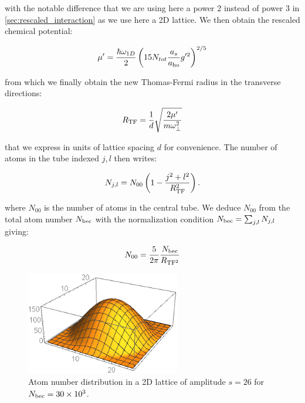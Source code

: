 \noindent with the notable difference that we are using here a power 2 instead of power 3 in \ref{sec:rescaled_interaction} as we use here a 2D lattice. We then obtain the rescaled chemical potential:

\begin{equation}
    \mu' = \frac{\hbar \omega_{1D}}{2} \left( 15 N_{tot} \frac{a_s}{a_{\rm{ho}}} g'^2 \right)^{2/5}
\end{equation}

\noindent from which we finally obtain the new Thomas-Fermi radius in the transverse directions:

\begin{equation}
    R_{\rm{TF}} = \frac{1}{d} \sqrt{\frac{2 \mu'}{m \omega_{\perp}^2}}
\end{equation}

\noindent that we express in units of lattice spacing $d$ for convenience. The number of atoms in the tube indexed $j,l$ then writes:

\begin{equation}\label{eq:N_per_tube}
    N_{j,l} = N_{00} \left( 1 - \frac{j^2 + l^2}{R_{\rm{TF}}^2} \right) .
\end{equation}

\noindent where $N_{00}$ is the number of atoms in the central tube. We deduce $N_{00}$ from the total atom number $N_{\rm{bec}}$ with the normalization condition $N_{\rm{bec}} = \sum_{j,l} N_{j,l}$ giving:

\begin{equation}
    N_{00} = \frac{5}{2 \pi} \frac{N_{\rm{bec}}}{R_{\rm{TF}^2}}
\end{equation}

\begin{figure}
    \centering
    \includegraphics[width=0.6\textwidth]{Fig/Chapter5/atomic_distrib_2Dlatt.PNG}
    \caption{Atom number distribution in a 2D lattice of amplitude $s=26$ for $N_{\rm{bec}}=30 \times 10^3$.}
    \label{fig:my_label}
\end{figure}

